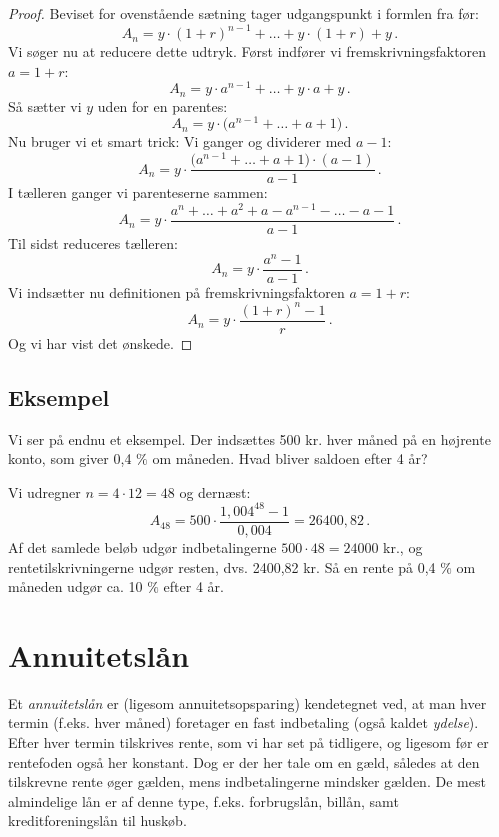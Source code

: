 \documentclass[12pt,oneside,a4paper]{article}
\begin{document}
\begin{tcolorbox}
\begin{proof}
Beviset for ovenstående sætning tager udgangspunkt i formlen fra før:
\[
A_n = y\cdot(1+r)^{n-1} + \ldots + y\cdot(1+r) + y \,.
\]
Vi søger nu at reducere dette udtryk. Først indfører vi fremskrivningsfaktoren $a=1+r$:
\[
A_n = y\cdot a^{n-1} + \ldots + y\cdot a + y \,.
\]
Så sætter vi $y$ uden for en parentes:
\[
A_n = y\cdot\big(a^{n-1} + \ldots + a + 1\big) \,.
\]
Nu bruger vi et smart trick: Vi ganger og dividerer med $a-1$:
\[
A_n = y\cdot\frac{\big(a^{n-1} + \ldots + a + 1\big)\cdot(a-1)}{a-1} \,.
\]
I tælleren ganger vi parenteserne sammen:
\[
A_n = y\cdot\frac{a^{n} + \ldots + a^2 + a - a^{n-1} - \ldots - a - 1}{a-1} \,.
\]
Til sidst reduceres tælleren:
\[
A_n = y\cdot\frac{a^{n} - 1}{a-1} \,.
\]
Vi indsætter nu definitionen på fremskrivningsfaktoren $a=1+r$:
\[
A_n = y\cdot\frac{(1+r)^{n} - 1}{r} \,.
\]
Og vi har vist det ønskede.
\end{proof}
\end{tcolorbox}

\begin{tcolorbox}
\subsection{Eksempel}
Vi ser på endnu et eksempel. Der indsættes 500 kr. hver måned på en højrente konto, som giver
0,4 $\%$ om måneden. Hvad bliver saldoen efter 4 år?

Vi udregner $n=4\cdot12 = 48$ og dernæst:
\[
A_{48} = 500\cdot\frac{1,004^{48}-1}{0,004} = 26400,82 \,.
\]
Af det samlede beløb udgør indbetalingerne $500\cdot 48 = 24000$ kr., og rentetilskrivningerne
udgør resten, dvs. 2400,82 kr. Så en rente på 0,4 $\%$ om måneden udgør ca. 10 $\%$ efter 4 år.

\end{tcolorbox}

\section{Annuitetslån}
Et \emph{annuitetslån} er (ligesom annuitetsopsparing) kendetegnet ved, at man
hver termin (f.eks. hver måned) foretager en fast indbetaling (også kaldet
\emph{ydelse}). Efter hver termin tilskrives rente, som vi har set på
tidligere, og ligesom før er rentefoden også her konstant. Dog er der her tale
om en gæld, således at den tilskrevne rente øger gælden, mens indbetalingerne
mindsker gælden.  De mest almindelige lån er af denne type, f.eks. forbrugslån,
billån, samt kreditforeningslån til huskøb.
\end{document}
